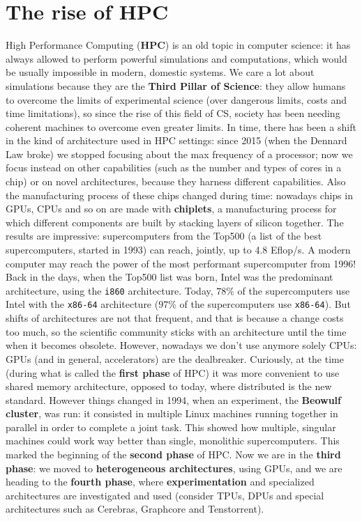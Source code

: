 \chapter{The rise of HPC}

High Performance Computing (\textbf{HPC}) is an old topic in computer science: it has always allowed to perform powerful simulations and computations, which would be usually impossible in modern, domestic systems. We care a lot about simulations because they are the \textbf{Third Pillar of Science}: they allow humans to overcome the limits of experimental science (over dangerous limits, costs and time limitations), so since the rise of this field of CS, society has been needing coherent machines to overcome even greater limits.
\nwl
In time, there has been a shift in the kind of architecture used in HPC settings: since 2015 (when the Dennard Law broke) we stopped focusing about the max frequency of a processor; now we focus instead on other capabilities (such as the number and types of cores in a chip) or on novel architectures, because they harness different capabilities.
\nwl
Also the manufacturing process of these chips changed during time: nowadays chips in GPUs, CPUs and so on are made with \textbf{chiplets}, a manufacturing process for which different components are built by stacking layers of silicon together. The results are impressive: supercomputers from the Top500 (a list of the best supercomputers, started in 1993) can reach, jointly, up to 4.8 Eflop/s. A modern computer may reach the power of the most performant supercomputer from 1996!
\nwl
Back in the days, when the Top500 list was born, Intel was the predominant architecture, using the \verb|i860| architecture. Today, $78\%$ of the supercomputers use Intel with the \verb|x86-64| architecture ($97\%$ of the supercomputers use \verb|x86-64|). But shifts of architectures are not that frequent, and that is because a change costs too much, so the scientific community sticks with an architecture until the time when it becomes obsolete. However, nowadays we don't use anymore solely CPUs: GPUs (and in general, accelerators) are the dealbreaker.
\nwl
Curiously, at the time (during what is called the \textbf{first phase} of HPC) it was more convenient to use shared memory architecture, opposed to today, where distributed is the new standard. However things changed in 1994, when an experiment, the \textbf{Beowulf cluster}, was run: it consisted in multiple Linux machines running together in parallel in order to complete a joint task. This showed how multiple, singular machines could work way better than single, monolithic supercomputers. This marked the beginning of the \textbf{second phase} of HPC. Now we are in the \textbf{third phase}: we moved to \textbf{heterogeneous architectures}, using GPUs, and we are heading to the \textbf{fourth phase}, where \textbf{experimentation} and specialized architectures are investigated and used (consider TPUs, DPUs and special architectures such as Cerebras, Graphcore and Tenstorrent).
